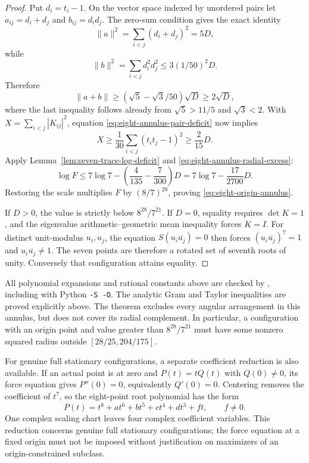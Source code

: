 \documentclass[11pt]{article}
\theoremstyle{remark}
\numberwithin{equation}{section}
\begin{document}
\begin{proof}
Put $d_i=t_i-1$. On the vector space indexed by unordered
pairs let $a_{ij}=d_i+d_j$ and $b_{ij}=d_id_j$.
The zero-sum condition gives the exact identity
\[
 \|a\|^2=\sum_{i<j}(d_i+d_j)^2=5D,
\]
while
\[
 \|b\|^2=\sum_{i<j}d_i^2d_j^2
 \le3(1/50)^2D.
\]
Therefore
\[
 \|a+b\|\ge(\sqrt5-\sqrt3/50)\sqrt D\ge2\sqrt D,
\]
where the last inequality follows already from
$\sqrt5>11/5$ and $\sqrt3<2$.
With $X=\sum_{i<j}|K_{ij}|^2$, equation
\eqref{eq:eight-annulus-pair-deficit} now implies
\[
 X\ge\frac1{30}\sum_{i<j}(t_it_j-1)^2\ge\frac2{15}D.
\]
Apply Lemma~\ref{lem:seven-trace-log-deficit} and
\eqref{eq:eight-annulus-radial-excess}:
\[
 \log F\le7\log7-\left(\frac4{135}-\frac7{300}\right)D
            =7\log7-\frac{17}{2700}D.
\]
Restoring the scale multiplies $F$ by $(8/7)^{28}$,
proving \eqref{eq:eight-origin-annulus}.

If $D>0$, the value is strictly below $8^{28}/7^{21}$.
If $D=0$, equality requires $\det K=1$, and the eigenvalue
arithmetic--geometric mean inequality forces $K=I$.
For distinct unit-modulus $u_i,u_j$, the equation
$S(u_i\overline{u_j})=0$ then forces
$(u_i\overline{u_j})^7=1$ and $u_i\overline{u_j}\ne1$.
The seven points are therefore a rotated set of seventh roots
of unity. Conversely that configuration attains equality.
\end{proof}

All polynomial expansions and rational constants above are checked
by , including with Python \texttt{-S -O}.
The analytic Gram and Taylor inequalities are proved explicitly above.
The theorem excludes every angular arrangement in this annulus,
but does not cover its radial complement. In particular, a configuration
with an origin point and value greater than $8^{28}/7^{21}$ must have
some nonzero squared radius outside $[28/25,204/175]$.

For genuine full stationary configurations, a separate coefficient
reduction is also available. If an actual point is at zero and
$P(t)=tQ(t)$ with $Q(0)\ne0$, its force equation gives
$P''(0)=0$, equivalently $Q'(0)=0$. Centering removes the
coefficient of $t^7$, so the eight-point root polynomial has the form
\[
 P(t)=t^8+a t^6+b t^5+c t^4+d t^3+f t,\qquad f\ne0.
\]
One complex scaling chart leaves four complex coefficient variables.
This reduction concerns genuine full stationary configurations;
the force equation at a fixed origin must not be imposed without
justification on maximizers of an origin-constrained subclass.
\end{document}
